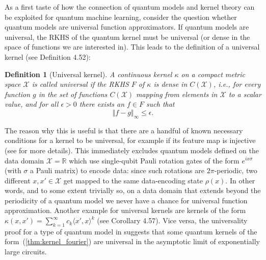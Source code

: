 \documentclass[aps, reprint, onecolumn, nofootinbib, longbibliography]{revtex4-2}
\newtheorem{theorem}{Theorem}[]
\newtheorem{definition}{Definition}[]
\begin{document}


As a first taste of how the connection of quantum models and kernel theory can be exploited for quantum machine learning, consider the question whether quantum models are universal function approximators. If quantum models are universal, the RKHS of the quantum kernel must be universal (or dense in the space of functions we are interested in). This leads to the definition of a universal kernel (see \cite{steinwart2008support} Definition 4.52):
\begin{definition}[Universal kernel]
A continuous kernel $\kappa$ on a compact metric space $\mathcal{X}$ is called
universal if the RKHS $F$ of $\kappa$ is dense in $C(\mathcal{X})$, i.e., for every function
$g$ in the set of functions $C(\mathcal{X})$ mapping from elements in $\mathcal{X}$ to a scalar value, and for all $\epsilon > 0$ there exists an $f \in F$ such that
\begin{equation}  \Vert f - g  \Vert_{\infty} \leq \epsilon.\end{equation}
\end{definition} 

The reason why this is useful is that there are a handful of known necessary conditions for a kernel to be universal, for example if its feature map is injective (see \cite{steinwart2008support} for more details). This immediately excludes quantum models defined on the data domain $\mathcal{X} = \mathbb{R}$ which use single-qubit Pauli rotation gates of the form $e^{ix \sigma}$ (with $\sigma$ a Pauli matrix) to encode data: since such rotations are $2\pi$-periodic, two different $x, x' \in \mathcal{X}$ get mapped to the same data-encoding state $\rho(x)$. In other words, and to some extent trivially so, on a data domain that extends beyond the periodicity of a quantum model we never have a chance for universal function approximation. Another example for universal kernels are kernels of the form $\kappa(x, x') = \sum_{k=1}^{\infty} c_k \langle x', x\rangle^k$ (see \cite{steinwart2008support} Corollary 4.57). Vice versa, the universality proof for a type of quantum model in \cite{schuld2020effect} suggests that some quantum kernels of the form~(\ref{thm:kernel_fourier}) are universal in the asymptotic limit of exponentially large circuits.
\end{document}
